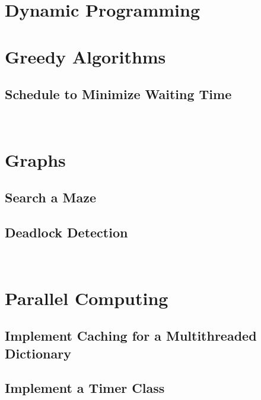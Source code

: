 \documentclass[11pt,a4paper]{article}
\begin{document}
\section{Dynamic Programming}

\section{Greedy Algorithms}

\subsection{Schedule to Minimize Waiting Time}

\ %

\section{Graphs}

\subsection{Search a Maze}

\subsection{Deadlock Detection}

\ %

\section{Parallel Computing}

\subsection{Implement Caching for a Multithreaded Dictionary}

\subsection{Implement a Timer Class}
\end{document}
